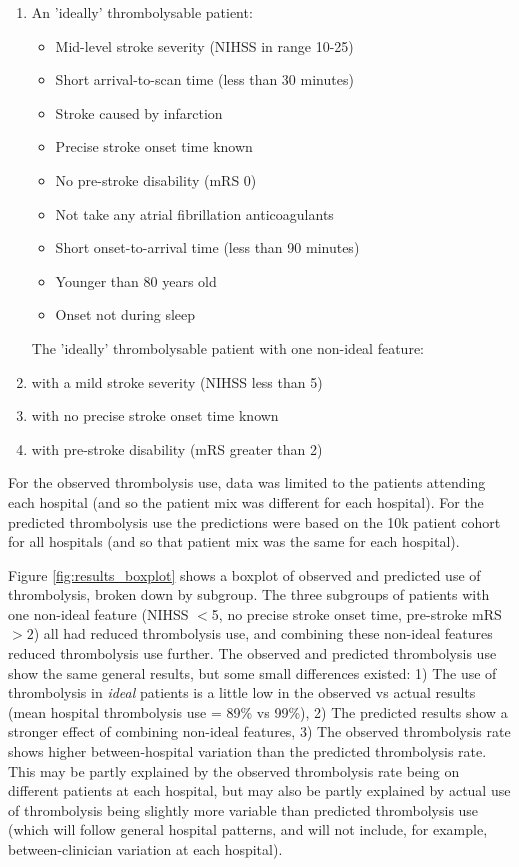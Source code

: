 \begin{itemize}
\begin{enumerate}
  \item An 'ideally' thrombolysable patient:
  \begin{itemize}
    \item Mid-level stroke severity (NIHSS in range 10-25)
    \item Short arrival-to-scan time (less than 30 minutes)
    \item Stroke caused by infarction
    \item Precise stroke onset time known
    \item No pre-stroke disability (mRS 0)
    \item Not take any atrial fibrillation anticoagulants
    \item Short onset-to-arrival time (less than 90 minutes)
    \item Younger than 80 years old
    \item Onset not during sleep
  \end{itemize}
  
  The 'ideally' thrombolysable patient with one non-ideal feature:
  \item with a mild stroke severity (NIHSS less than 5)
  \item with no precise stroke onset time known
  \item with pre-stroke disability (mRS greater than 2)
\end{enumerate}

For the observed thrombolysis use, data was limited to the patients attending each hospital (and so the patient mix was different for each hospital). For the predicted thrombolysis use the predictions were based on the 10k patient cohort for all hospitals (and so that patient mix was the same for each hospital).

Figure \ref{fig:results_boxplot} shows a boxplot of observed and predicted use of thrombolysis, broken down by subgroup. The three subgroups of patients with one non-ideal feature (NIHSS $<$5, no precise stroke onset time, pre-stroke mRS $>2$) all had reduced thrombolysis use, and combining these non-ideal features reduced thrombolysis use further. The observed and predicted thrombolysis use show the same general results, but some small differences existed: 1) The use of thrombolysis in \emph{ideal} patients is a little low in the observed vs actual results (mean hospital thrombolysis use = 89\% vs 99\%), 2) The predicted results show a stronger effect of combining non-ideal features, 3) The observed thrombolysis rate shows higher between-hospital variation than the predicted thrombolysis rate. This may be partly explained by the observed thrombolysis rate being on different patients at each hospital, but may also be partly explained by actual use of thrombolysis being slightly more variable than predicted thrombolysis use (which will follow general hospital patterns, and will not include, for example, between-clinician variation at each hospital).


\end{itemize}
